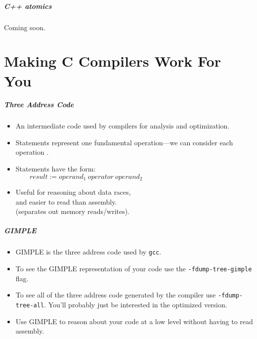 \documentclass[aspectratio=43]{beamer}
\newenvironment{changemargin}[1]{%
  \begin{list}{}{%
    \setlength{\topsep}{0pt}%
    \setlength{\leftmargin}{#1}%
    \setlength{\rightmargin}{1em}
    \setlength{\listparindent}{\parindent}%
    \setlength{\itemindent}{\parindent}%
    \setlength{\parsep}{\parskip}%
  }%
  \item[]}{\end{list}}
\begin{document}
\begin{frame}
  \frametitle{C++ atomics}

  Coming soon.
\end{frame}

\part{Making C Compilers Work For You}
\frame{\partpage}

\begin{frame}
  \frametitle{Three Address Code}

  \begin{changemargin}{2.5cm}
  \begin{itemize}
    \item An intermediate code used by compilers
      for analysis and optimization.
    \vfill
    \item Statements represent one fundamental operation---we
      can consider each operation .
    \vfill
    \item Statements have the form:\\
      $\qquad result := operand_1\:operator\:operand_2$
    \vfill
    \item Useful for reasoning about data races,\\ and easier to read than assembly. \\
            \hspace*{1cm} (separates out memory reads/writes).
  \end{itemize}
  \end{changemargin}
\end{frame}

\begin{frame}
  \frametitle{GIMPLE}

  \begin{changemargin}{2.5cm}
  \begin{itemize}
    \item GIMPLE is the three address code used by {\tt gcc}.
    \vfill
    \item To see the GIMPLE representation of your code use the
      {\tt -fdump-tree-gimple} flag.
    \vfill
    \item To see all of the three address code generated by the compiler use
      {\tt -fdump-tree-all}. You'll probably just be interested in the
      optimized version.
    \vfill
    \item Use GIMPLE to reason about your code at a low level without
      having to read assembly.
  \end{itemize}
  \end{changemargin}
\end{frame}
\end{document}
